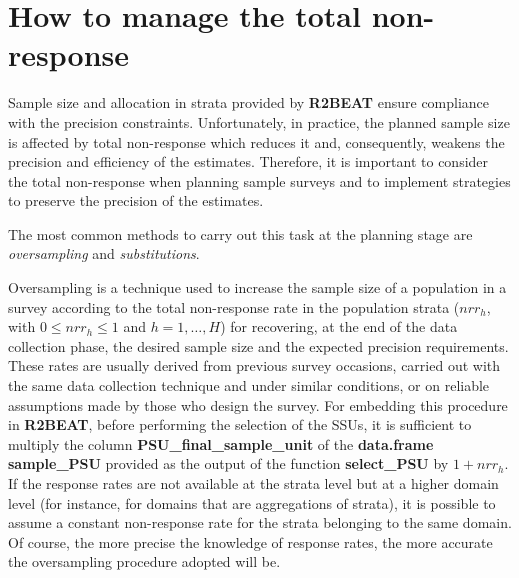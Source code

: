 \section{How to manage the total non-response}
Sample size and allocation in strata provided by \textbf{R2BEAT} ensure compliance with the precision constraints. 
Unfortunately, in practice, the planned sample size is affected by total non-response which reduces it and, consequently, weakens the precision and efficiency of the estimates.
Therefore, it is important to consider the total non-response when planning sample surveys and to implement strategies to preserve the precision of the estimates. 


The most common methods to carry out this task at the planning stage are \textit{oversampling} and \textit{substitutions}. 

Oversampling is a technique used to increase the sample size of a population in a survey according to the total non-response rate in the population strata ($nrr_h$, with $0\leq nrr_h \leq 1$ and $h=1,\dots,H$) for recovering, at the end of the data collection phase, the desired sample size and the expected precision requirements.
These rates are usually derived from previous survey occasions, carried out with the same data collection technique and under similar conditions, or on reliable assumptions made by those who design the survey. 
For embedding this procedure in \textbf{R2BEAT}, before performing the selection of the SSUs, it is sufficient to multiply the column \textbf{PSU\_final\_sample\_unit} of the \textbf{data.frame} \textbf{sample\_PSU} provided as the output of the function \textbf{select\_PSU} by $1+nrr_h$. 
If the response rates are not available at the strata level but at a higher domain level (for instance, for domains that are aggregations of strata), it is possible to assume a constant non-response rate for the strata belonging to the same domain.
Of course, the more precise the knowledge of response rates, the more accurate the oversampling procedure adopted will be. 

